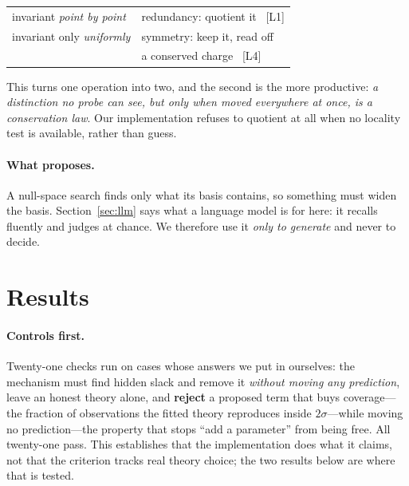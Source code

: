 \documentclass[aps,pra,twocolumn,superscriptaddress,nofootinbib,10pt]{revtex4-2}
\begin{document}
\begin{center}\footnotesize
\begin{tabular}{@{}ll@{}}
\toprule
invariant \emph{point by point} & redundancy: quotient it \ [L1] \\
invariant only \emph{uniformly} & symmetry: keep it, read off \\
                                & a conserved charge \ [L4] \\
\bottomrule
\end{tabular}
\end{center}

This turns one operation into two, and the second is the more productive: \emph{a distinction no
probe can see, but only when moved everywhere at once, is a conservation law}. Our implementation
refuses to quotient at all when no locality test is available, rather than guess.

\paragraph{What proposes.} A null-space search finds only what its basis contains, so something
must widen the basis. Section~\ref{sec:llm} says what a language model is for here: it recalls
fluently and judges at chance. We therefore use it \emph{only to generate} and never to decide.

\section{Results}

\paragraph{Controls first.} Twenty-one checks run on cases whose answers we put in ourselves: the
mechanism must find hidden slack and remove it \emph{without moving any prediction}, leave an
honest theory alone, and \textbf{reject} a proposed term that buys coverage---the fraction of
observations the fitted theory reproduces inside $2\sigma$---while moving no
prediction---the property that stops ``add a parameter'' from being free. All twenty-one pass.
This establishes that the implementation does what it claims, not that the criterion tracks real
theory choice; the two results below are where that is tested.
\end{document}
